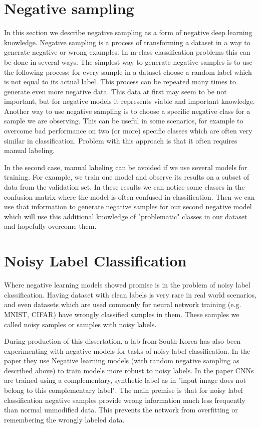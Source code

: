 \documentclass[b5paper]{book}
\let\cite\parencite
\begin{document}
\section{Negative sampling}

In this section we describe negative sampling as a form of negative deep learning knowledge. Negative sampling is a process of transforming a dataset in a way to generate negative or wrong examples. In m-class classification problems this can be done in several ways. The simplest way to generate negative samples is to use the following process: for every sample in a dataset choose a random label which is not equal to its actual label. This process can be repeated many times to generate even more negative data. This data at first may seem to be not important, but for negative models it represents viable and important knowledge. Another way to use negative sampling is to choose a specific negative class for a sample we are observing. This can be useful in some scenarios, for example to overcome bad performance on two (or more) specific classes which are often very similar in classification. Problem with this approach is that it often requires manual labeling.

In the second case, manual labeling can be avoided if we use several models for training. For example, we train one model and observe its results on a subset of data from the validation set. In these results we can notice some classes in the confusion matrix where the model is often confused in classification. Then we can use that information to generate negative samples for our second negative model which will use this additional knowledge of "problematic" classes in our dataset and hopefully overcome them.

\section{Noisy Label Classification}

Where negative learning models showed promise is in the problem of noisy label classification. Having dataset with clean labels is very rare in real world scenarios, and even datasets which are used commonly for neural network training (e.g. MNIST, CIFAR) have wrongly classified samples in them. These samples we called noisy samples or samples with noisy labels.

During production of this dissertation, a lab from South Korea has also been experimenting with negative models for tasks of noisy label classification. \cite{kim2019nlnl} In the paper they use Negative learning models (with random negative sampling as described above) to train models more robust to noisy labels. In the paper CNNs are trained using a complementary, synthetic label as in "input image does not belong to this complementary label". The main premise is that for noisy label classification negative samples provide wrong information much less frequently than normal unmodified data. This prevents the network from overfitting or remembering the wrongly labeled data.
\end{document}
